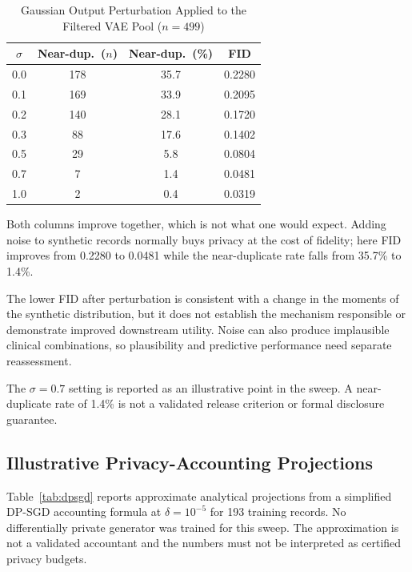 \documentclass[manuscript,review,screen,nonacm]{acmart}
\newif\ifshowrevisions
\DeclareRobustCommand{\rev}[1]{\ifshowrevisions{\color{revisionblue}#1}\else#1\fi}
\begin{document}
\begin{table}[!t]
  \centering
  \caption{Gaussian Output Perturbation Applied to the Filtered VAE Pool ($n = 499$)}
  \label{tab:perturb}
  \begin{tabular}{cccc}
    \toprule
    $\sigma$ & Near-dup.\ ($n$) & Near-dup.\ (\%) & FID \\
    \midrule
    0.0 & 178 & 35.7 & 0.2280 \\
    0.1 & 169 & 33.9 & 0.2095 \\
    0.2 & 140 & 28.1 & 0.1720 \\
    0.3 & 88 & 17.6 & 0.1402 \\
    0.5 & 29 & 5.8 & 0.0804 \\
    0.7 & 7 & 1.4 & 0.0481 \\
    1.0 & 2 & 0.4 & 0.0319 \\
    \bottomrule
  \end{tabular}
\end{table}

Both columns improve together, which is not what one would expect. Adding noise to synthetic records normally buys privacy at the cost of fidelity; here FID improves from 0.2280 to 0.0481 while the near-duplicate rate falls from 35.7\% to 1.4\%.

\rev{The lower FID after perturbation is consistent with a change in the moments of the synthetic distribution, but it does not establish the mechanism responsible or demonstrate improved downstream utility. Noise can also produce implausible clinical combinations, so plausibility and predictive performance need separate reassessment.}

\rev{The $\sigma=0.7$ setting is reported as an illustrative point in the sweep. A near-duplicate rate of 1.4\% is not a validated release criterion or formal disclosure guarantee.}

\subsection{Illustrative Privacy-Accounting Projections}

\rev{Table~\ref{tab:dpsgd} reports approximate analytical projections from a simplified DP-SGD accounting formula at $\delta=10^{-5}$ for 193 training records. No differentially private generator was trained for this sweep. The approximation is not a validated accountant and the numbers must not be interpreted as certified privacy budgets.}
\end{document}
